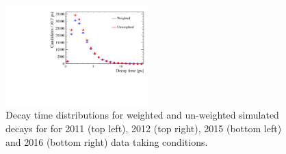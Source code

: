 \begin{figure}[htbp]
    \includegraphics[width=0.49\textwidth]{./Figs/LifetimeMeasurement/2016_decaytime_Bd2KPi_weighting_impact.pdf}
  \caption{Decay time distributions for weighted and un-weighted \bdkpi simulated decays for for 2011 (top left), 2012 (top right), 2015 (bottom left) and 2016 (bottom right) data taking conditions.}
  \label{fig:BdToKpi_weightDecayTime}
\end{figure}


